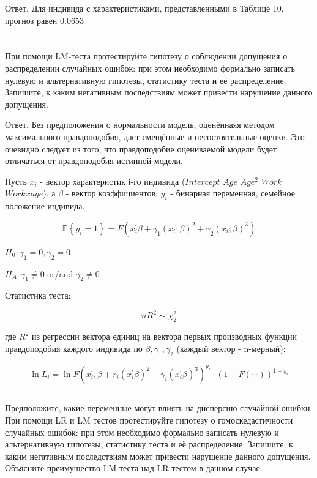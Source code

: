 \documentclass[a4paper,12pt]{article}
\def \b{\beta}
\begin{document}
Ответ. Для индивида с характеристиками, представленными в Таблице 10, прогноз равен 0.0653

\section{}
\subsection{}
\Sun При помощи LM-теста протестируйте гипотезу о соблюдении допущения о
распределении случайных ошибок: при этом необходимо формально записать нулевую и
альтернативную гипотезы, статистику теста и её распределение. Запишите, к каким
негативным последствиям может привести нарушение данного допущения.


Ответ. Без предположения о нормальности модель, оценённаяя методом максимального правдоподобия, даст смещённые и несостоятельные оценки. Это очевидно следует из того, что правдоподобие оцениваемой модели будет отличаться от правдоподобия истинной модели.

Пусть $ x_i $ - вектор характеристик i-го индивида ($ Intercept $ $  Age  $ $ Age^2 $ $ Work  $ $ Workxage $), а $ \b $ - вектор коэффициентов. $ y_i $ - бинарная переменная, семейное положение индивида. 

\[ \mathbb{P}\left\{y_{i}=1\right\}=F\left(x_{i}^{\prime} \beta+\gamma_{1}\left(x_{i} ; \beta\right)^{2}+\gamma_{2}\left(x_{i} ; \beta\right)^{3}\right) \]

$ H_0: \gamma_1 = 0, \gamma_2 = 0 $

$ H_A: \gamma_1 \neq 0$ or/and $ \gamma_2 \neq 0 $

Статистика теста:

\[ nR^2 \sim \chi^2_2 \]

где $ R^2 $ из регрессии вектора единиц на вектора первых производных функции правдоподобия каждого индивида по $ \beta, \gamma_1, \gamma_2 $ (каждый вектор - n-мерный):

\[ \ln L_{i}=\ln F\left(x_{i}^{\prime}, \beta+r_{i}\left(x_{i}^{\prime} \beta\right)^{2}+\gamma_{i}\left(x_{i}^{\prime} \beta\right)^{3}\right)^{y_{i}} \cdot (1-F(\cdots))^{1-y_{i}} \]
\subsection{}

\Sun Предположите, какие переменные могут влиять на дисперсию случайной
ошибки. При помощи LR и LM тестов протестируйте гипотезу о гомоскедастичности
случайных ошибок: при этом необходимо формально записать нулевую и альтернативную
гипотезы, статистику теста и её распределение. Запишите, к каким негативным
последствиям может привести нарушение данного допущения. Объясните преимущество
LM теста над LR тестом в данном случае.
\end{document}
